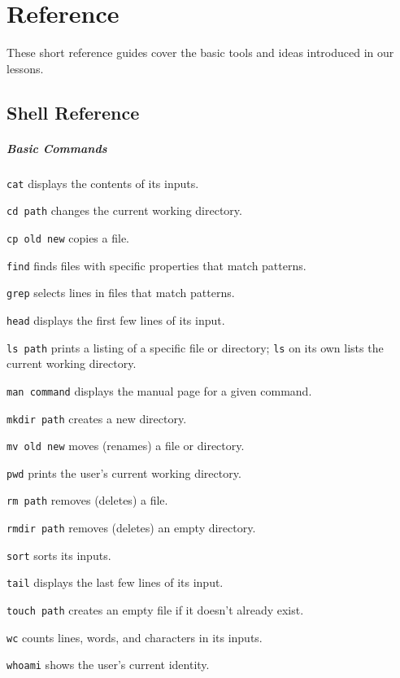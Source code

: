 \documentclass{book}
\begin{document}
\chapter{Reference}\label{s:reference}

These short reference guides cover the basic tools and ideas introduced
in our lessons.

\section{Shell Reference}

\mbox{}\paragraph{Basic Commands}

\begin{swcitemize}
\item
  \texttt{cat} displays the contents of its inputs.
\item
  \texttt{cd path} changes the current working directory.
\item
  \texttt{cp old new} copies a file.
\item
  \texttt{find} finds files with specific properties that match
  patterns.
\item
  \texttt{grep} selects lines in files that match patterns.
\item
  \texttt{head} displays the first few lines of its input.
\item
  \texttt{ls path} prints a listing of a specific file or directory;
  \texttt{ls} on its own lists the current working directory.
\item
  \texttt{man command} displays the manual page for a given command.
\item
  \texttt{mkdir path} creates a new directory.
\item
  \texttt{mv old new} moves (renames) a file or directory.
\item
  \texttt{pwd} prints the user's current working directory.
\item
  \texttt{rm path} removes (deletes) a file.
\item
  \texttt{rmdir path} removes (deletes) an empty directory.
\item
  \texttt{sort} sorts its inputs.
\item
  \texttt{tail} displays the last few lines of its input.
\item
  \texttt{touch path} creates an empty file if it doesn't already exist.
\item
  \texttt{wc} counts lines, words, and characters in its inputs.
\item
  \texttt{whoami} shows the user's current identity.
\end{swcitemize}
\end{document}
